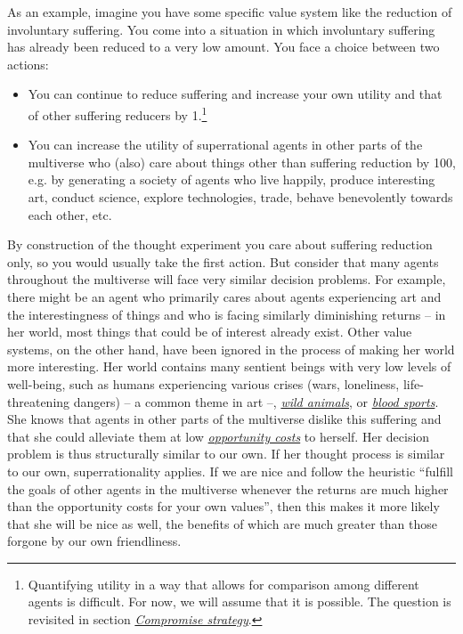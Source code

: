 As an example, imagine you have some specific value system like the
reduction of involuntary suffering. You come into a situation in which
involuntary suffering has already been reduced to a very low amount. You
face a choice between two actions:

\begin{itemize}
\item
  You can continue to reduce suffering and increase your own utility and
  that of other suffering reducers by 1.\footnote{Quantifying utility in
    a way that allows for comparison among different agents is
    difficult. For now, we will assume that it is possible. The question
    is revisited in section
    \protect\hyperlink{compromise-strategy}{\emph{Compromise
    strategy}}.}
\item
  You can increase the utility of superrational agents in other parts of
  the multiverse who (also) care about things other than suffering
  reduction by 100, e.g. by generating a society of agents who live
  happily, produce interesting art, conduct science, explore
  technologies, trade, behave benevolently towards each other, etc.
\end{itemize}

By construction of the thought experiment you care about suffering
reduction only, so you would usually take the first action. But consider
that many agents throughout the multiverse will face very similar
decision problems. For example, there might be an agent who primarily
cares about agents experiencing art and the interestingness of things
and who is facing similarly diminishing returns -- in her world, most
things that could be of interest already exist. Other value systems, on
the other hand, have been ignored in the process of making her world
more interesting. Her world contains many sentient beings with very low
levels of well-being, such as humans experiencing various crises (wars,
loneliness, life-threatening dangers) -- a common theme in art --,
\href{https://foundational-research.org/the-importance-of-wild-animal-suffering/}{\emph{wild
animals}}, or
\href{https://en.wikipedia.org/wiki/Blood_sport}{\emph{blood sports}}.
She knows that agents in other parts of the multiverse dislike this
suffering and that she could alleviate them at low
\href{https://en.wikipedia.org/wiki/Opportunity_cost}{\emph{opportunity
costs}} to herself. Her decision problem is thus structurally similar to
our own. If her thought process is similar to our own, superrationality
applies. If we are nice and follow the heuristic ``fulfill the goals of
other agents in the multiverse whenever the returns are much higher than
the opportunity costs for your own values'', then this makes it more
likely that she will be nice as well, the benefits of which are much
greater than those forgone by our own friendliness.

